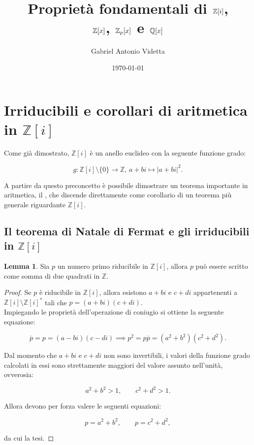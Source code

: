 \documentclass[a4paper]{article}
\title{Proprietà fondamentali di $\ZZi$, \\ $\mathbb{Z}[x]$, $\mathbb{Z}_p[x]$ e $\mathbb{Q}[x]$}
\author{Gabriel Antonio Videtta}
\date{\today}
\newcommand{\norm}[1]{\left|#1\right|}
\newcommand{\setminuszero}{\setminus \{0\}}
\newcommand{\ZZ}{\mathbb{Z}}
\newcommand{\ZZi}{\mathbb{Z}[i]}
\theoremstyle{definition}
\newtheorem{lemma}{Lemma}[section]
\begin{document}
\maketitle

\tableofcontents

\section{Irriducibili e corollari di aritmetica in $\ZZi$}

Come già dimostrato, $\ZZi$ è un anello euclideo con la seguente
funzione grado:

\[ g : \ZZi \setminuszero \to \ZZ,\, a+bi \mapsto  \norm{a+bi}^2.\]

A partire da questo preconcetto è possibile dimostrare un teorema
importante in aritmetica, il ,
che discende direttamente come corollario di un teorema più
generale riguardante $\ZZi$.

\subsection{Il teorema di Natale di Fermat e gli irriducibili in $\ZZi$}

\begin{lemma}
    \label{lem:riducibile_due_quadrati}
    Sia $p$ un numero primo riducibile in $\ZZi$, allora $p$
    può essere scritto come somma di due quadrati in $\ZZ$.
\end{lemma}

\begin{proof}
    Se $p$ è riducibile in $\ZZi$, allora esistono $a+bi$ e
    $c+di$ appartenenti a $\ZZi \setminus \ZZi^*$ tali che $p=(a+bi)(c+di)$. \\

    Impiegando le proprietà dell'operazione di coniugio si
    ottiene la seguente equazione:

    \[ \overline{p}=p=(a-bi)(c-di) \implies p^2=p \overline{p} = (a^2+b^2)(c^2+d^2). \]

    Dal momento che $a+bi$ e $c+di$ non sono invertibili,
    i valori della funzione grado calcolati in essi sono strettamente
    maggiori del valore assunto nell'unità, ovverosia:

    \[ a^2+b^2>1, \qquad c^2+d^2>1. \]

    Allora devono per forza valere le seguenti equazioni:

    \[ p=a^2+b^2, \qquad p=c^2+d^2, \]

    da cui la tesi.
\end{proof}
\end{document}
